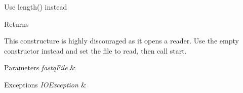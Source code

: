 
\begin{DoxyRefList}
\item[\label{deprecated__deprecated000001}%
\hypertarget{deprecated__deprecated000001}{}%
Member \hyperlink{interfacebroad_1_1core_1_1annotation_1_1_genomic_annotation_a0b276757bb75b768a6c6a266a9daa96d}{broad.core.annotation.Genomic\+Annotation.get\+Length} ()]Use length() instead \begin{DoxyReturn}{Returns}

\end{DoxyReturn}

\item[\label{deprecated__deprecated000002}%
\hypertarget{deprecated__deprecated000002}{}%
Member \hyperlink{classbroad_1_1pda_1_1seq_1_1fastq_1_1_fastq_parser_a77a045bf908924dbb09af31bf3873493}{broad.pda.seq.fastq.Fastq\+Parser.Fastq\+Parser} (File fastq\+File)]This constructure is highly discouraged as it opens a reader. Use the empty constructor instead and set the file to read, then call start. 
\begin{DoxyParams}{Parameters}
{\em fastq\+File} & \\
\hline
\end{DoxyParams}

\begin{DoxyExceptions}{Exceptions}
{\em I\+O\+Exception} & \\
\hline
\end{DoxyExceptions}

\end{DoxyRefList}